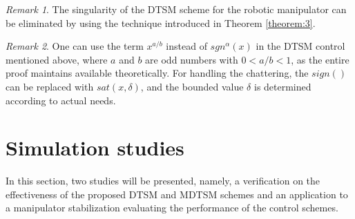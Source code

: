 \documentclass[3p]{elsarticle}
\theoremstyle{plain}
\theoremstyle{remark}
\newtheorem{myrem}{Remark}
\begin{document}
\begin{myrem}
The singularity of the DTSM scheme for the robotic manipulator can be eliminated by using the technique introduced in Theorem \ref{theorem:3}.
\end{myrem}
\begin{myrem}
One can use the term $x^{a/b}$ instead of $sgn^\alpha(x)$ in the DTSM control mentioned above, where $a$ and $b$ are odd numbers with $0<a/b<1$, as the entire proof maintains available theoretically. For handling the chattering, the $sign()$ can be replaced with $sat(x,\delta)$, and the bounded value $\delta$ is determined according to actual needs.
\end{myrem}
\section{Simulation studies}\label{sec:4}
In this section, two studies will be presented, namely, a verification on the effectiveness of the proposed DTSM and MDTSM schemes and an application to a manipulator stabilization evaluating the performance of the control schemes.
\end{document}
